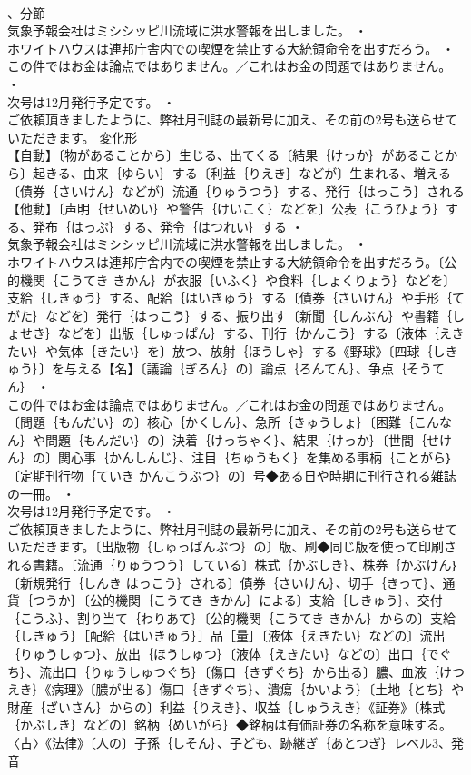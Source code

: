 \documentclass[8pt]{extreport}
\begin{document}
\begin{CJK}{UTF8}{min}
\\	、分節
\\	気象予報会社はミシシッピ川流域に洪水警報を出しました。 ・
\\	ホワイトハウスは連邦庁舎内での喫煙を禁止する大統領命令を出すだろう。 ・
\\	この件ではお金は論点ではありません。／これはお金の問題ではありません。 ・
\\	次号は12月発行予定です。 ・
\\	ご依頼頂きましたように、弊社月刊誌の最新号に加え、その前の2号も送らせていただきます。	変化形 
\\	【自動】〔物があることから〕生じる、出てくる〔結果｛けっか｝があることから〕起きる、由来｛ゆらい｝する〔利益｛りえき｝などが〕生まれる、増える〔債券｛さいけん｝などが〕流通｛りゅうつう｝する、発行｛はっこう｝される【他動】〔声明｛せいめい｝や警告｛けいこく｝などを〕公表｛こうひょう｝する、発布｛はっぷ｝する、発令｛はつれい｝する ・
\\	気象予報会社はミシシッピ川流域に洪水警報を出しました。 ・
\\	ホワイトハウスは連邦庁舎内での喫煙を禁止する大統領命令を出すだろう。〔公的機関｛こうてき きかん｝が衣服｛いふく｝や食料｛しょくりょう｝などを〕支給｛しきゅう｝する、配給｛はいきゅう｝する〔債券｛さいけん｝や手形｛てがた｝などを〕発行｛はっこう｝する、振り出す〔新聞｛しんぶん｝や書籍｛しょせき｝などを〕出版｛しゅっぱん｝する、刊行｛かんこう｝する〔液体｛えきたい｝や気体｛きたい｝を〕放つ、放射｛ほうしゃ｝する《野球》〔四球｛しきゅう｝〕を与える【名】〔議論｛ぎろん｝の〕論点｛ろんてん｝、争点｛そうてん｝ ・
\\	この件ではお金は論点ではありません。／これはお金の問題ではありません。〔問題｛もんだい｝の〕核心｛かくしん｝、急所｛きゅうしょ｝〔困難｛こんなん｝や問題｛もんだい｝の〕決着｛けっちゃく｝、結果｛けっか｝〔世間｛せけん｝の〕関心事｛かんしんじ｝、注目｛ちゅうもく｝を集める事柄｛ことがら｝〔定期刊行物｛ていき かんこうぶつ｝の〕号◆ある日や時期に刊行される雑誌の一冊。 ・
\\	次号は12月発行予定です。 ・
\\	ご依頼頂きましたように、弊社月刊誌の最新号に加え、その前の2号も送らせていただきます。〔出版物｛しゅっぱんぶつ｝の〕版、刷◆同じ版を使って印刷される書籍。〔流通｛りゅうつう｝している〕株式｛かぶしき｝、株券｛かぶけん｝〔新規発行｛しんき はっこう｝される〕債券｛さいけん｝、切手｛きって｝、通貨｛つうか｝〔公的機関｛こうてき きかん｝による〕支給｛しきゅう｝、交付｛こうふ｝、割り当て｛わりあて｝〔公的機関｛こうてき きかん｝からの〕支給｛しきゅう｝［配給｛はいきゅう｝］品［量］〔液体｛えきたい｝などの〕流出｛りゅうしゅつ｝、放出｛ほうしゅつ｝〔液体｛えきたい｝などの〕出口｛でぐち｝、流出口｛りゅうしゅつぐち｝〔傷口｛きずぐち｝から出る〕膿、血液｛けつえき｝《病理》〔膿が出る〕傷口｛きずぐち｝、潰瘍｛かいよう｝〔土地｛とち｝や財産｛ざいさん｝からの〕利益｛りえき｝、収益｛しゅうえき｝《証券》〔株式｛かぶしき｝などの〕銘柄｛めいがら｝◆銘柄は有価証券の名称を意味する。〈古〉《法律》〔人の〕子孫｛しそん｝、子ども、跡継ぎ｛あとつぎ｝レベル3、発音

\end{CJK}
\end{document}

